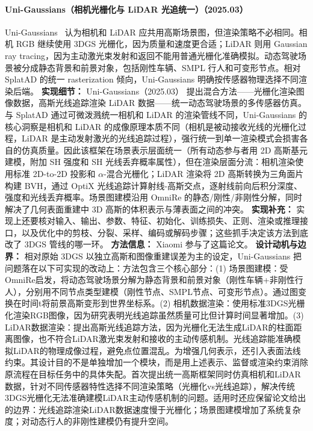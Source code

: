 \paragraph{Uni-Gaussians（相机光栅化与 LiDAR 光追统一）（2025.03）}
Uni-Gaussians~\cite{2503_08317} 认为相机和 LiDAR 应共用高斯场景图，但渲染策略不必相同。相机 RGB 继续使用 3DGS 光栅化，因为质量和速度更合适；LiDAR 则用 Gaussian ray tracing，因为主动激光束发射和返回不能用普通光栅化准确模拟。动态驾驶场景被分成静态背景和前景对象，包括刚性车辆、SMPL 行人和可变形节点。相对 SplatAD 的统一 rasterization 倾向，Uni-Gaussians 明确按传感器物理选择不同渲染后端。
\textbf{实现细节：} Uni-Gaussians（2025.03） 提出混合方法——光栅化渲染图像数据，高斯光线追踪渲染 LiDAR 数据——统一动态驾驶场景的多传感器仿真。与 SplatAD 通过可微泼溅统一相机和 LiDAR 的渲染管线不同，Uni-Gaussians 的核心洞察是相机和 LiDAR 的成像原理本质不同（相机是被动接收光线的光栅化过程，LiDAR 是主动发射激光的光线追踪过程），强行统一到单一渲染模式会损害各自的仿真质量。因此该框架在场景表示层面统一（所有动态参与者用 2D 高斯基元建模，附加 SH 强度和 SH 光线丢弃概率属性），但在渲染层面分流：相机渲染使用标准 2D-to-2D 投影和 $\alpha$-混合光栅化；LiDAR 渲染将 2D 高斯转换为三角面片构建 BVH，通过 OptiX 光线追踪计算射线-高斯交点，逐射线前向后积分深度、强度和光线丢弃概率。场景图建模沿用 OmniRe 的静态/刚性/非刚性分解，同时解决了几何表面重建中 3D 高斯的体积表示与薄表面之间的冲突。
\textbf{实现补充：} 实现上还要核对输入、输出、参数、特征、初始化、训练损失、正则、渲染或推理接口，以及优化中的剪枝、分裂、采样、编码或解码步骤；这些抓手决定该方法到底改了 3DGS 管线的哪一环。
\textbf{方法信息：} Xiaomi 参与了这篇论文。
\textbf{设计动机与边界：} 相对原始 3DGS 以独立高斯和图像重建误差为主的设定，Uni-Gaussians 把问题落在以下可实现的改动上：方法包含三个核心部分：(1) 场景图建模：受OmniRe启发，将动态驾驶场景分解为静态背景和前景对象（刚性车辆+非刚性行人），分别用不同节点类型建模（刚性节点、SMPL节点、可变形节点）。通过图变换在时间t将前景高斯变形到世界坐标系。(2) 相机数据渲染：使用标准3DGS光栅化渲染RGB图像，因为研究表明光线追踪虽然质量可比但计算时间显著增加。(3) LiDAR数据渲染：提出高斯光线追踪方法，因为光栅化无法生成LiDAR的柱面距离图像，也不符合LiDAR激光束发射和接收的主动传感机制。光线追踪能准确模拟LiDAR的物理成像过程，避免点位置混乱。为增强几何表示，还引入表面法线约束。其设计目的不是单独增加一个模块，而是用上述表示、监督或渲染约束消除原流程在目标任务中的具体失配。首次提出统一高斯框架同时仿真相机和LiDAR数据，针对不同传感器特性选择不同渲染策略（光栅化vs光线追踪），解决传统3DGS光栅化无法准确建模LiDAR主动传感机制的问题。适用时还应保留论文给出的边界：光线追踪渲染LiDAR数据速度慢于光栅化；场景图建模增加了系统复杂度；对动态行人的非刚性建模仍有提升空间。
